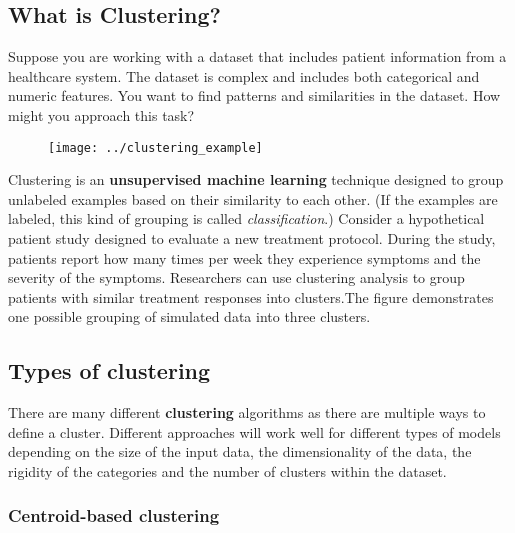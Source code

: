 \subsection{What is Clustering?}
\date{}

	
	\maketitle
	
	Suppose you are working with a dataset that includes patient information from a healthcare system. The dataset is complex and includes both categorical and numeric features. You want to find patterns and similarities in the dataset. How might you approach this task?
\begin{figure}
	\centering
	\texttt{[image: ../clustering\_example]}
	\caption{}
	\label{fig:clusteringexample}
\end{figure}
	
	\par Clustering is an \textbf{unsupervised machine learning} technique designed to group unlabeled examples based on their similarity to each other. (If the examples are labeled, this kind of grouping is called \emph{classification}.) Consider a hypothetical patient study designed to evaluate a new treatment protocol. During the study, patients report how many times per week they experience symptoms and the severity of the symptoms. Researchers can use clustering analysis to group patients with similar treatment responses into clusters.The figure demonstrates one possible grouping of simulated data into three clusters.
	
\subsection{Types of clustering}

\par There are many different \textbf{clustering} algorithms as there are multiple ways to define a cluster. Different approaches will work well for different types of models depending on the size of the input data, the dimensionality of the data, the rigidity of the categories and the number of clusters within the dataset.
\subsubsection{Centroid-based clustering}

